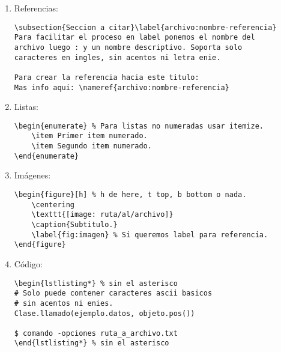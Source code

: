\begin{enumerate}
\begin{enumerate}
\begin{lstlisting}
Los parrafos se separan con una linea en blanco.
	\end{lstlisting}

	\item Quitar sangría:
	\begin{lstlisting}
\noindent Primera linea sin sangria.
	\end{lstlisting}
	\end{enumerate}

\item Referencias:
\begin{lstlisting}
\subsection{Seccion a citar}\label{archivo:nombre-referencia}
Para facilitar el proceso en label ponemos el nombre del
archivo luego : y un nombre descriptivo. Soporta solo
caracteres en ingles, sin acentos ni letra enie.

Para crear la referencia hacia este titulo:
Mas info aqui: \nameref{archivo:nombre-referencia}
\end{lstlisting}

\item Listas:
\begin{lstlisting}
\begin{enumerate} % Para listas no numeradas usar itemize.
    \item Primer item numerado.
    \item Segundo item numerado.
\end{enumerate}
\end{lstlisting}

\item Imágenes:
\begin{lstlisting}
\begin{figure}[h] % h de here, t top, b bottom o nada.
    \centering
    \texttt{[image: ruta/al/archivo]}
    \caption{Subtitulo.}
    \label{fig:imagen} % Si queremos label para referencia.
\end{figure}
\end{lstlisting}

\item Código:
\begin{lstlisting}
\begin{lstlisting*} % sin el asterisco
# Solo puede contener caracteres ascii basicos
# sin acentos ni enies.
Clase.llamado(ejemplo.datos, objeto.pos())

$ comando -opciones ruta_a_archivo.txt
\end{lstlisting*} % sin el asterisco
\end{lstlisting}


\end{enumerate}
